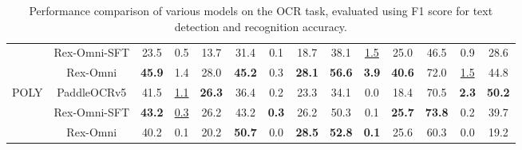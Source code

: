 \begin{table}[t]
{\begin{tabular}{cc|ccc|ccc|ccc|ccc}
& \cellcolor{lightblue!10}Rex-Omni-SFT & \cellcolor{lightblue!10}23.5 & \cellcolor{lightblue!10}0.5 &\cellcolor{lightblue!10} 13.7 & \cellcolor{lightblue!10}31.4 &\cellcolor{lightblue!10} 0.1 & \cellcolor{lightblue!10}18.7 & \cellcolor{lightblue!10}38.1 & \cellcolor{lightblue!10}\underline{1.5} & \cellcolor{lightblue!10}25.0 & \cellcolor{lightblue!10}46.5 & \cellcolor{lightblue!10}0.9 & \cellcolor{lightblue!10}28.6 \\
& \cellcolor{lightblue!10}Rex-Omni & \cellcolor{lightblue!10}\textbf{45.9} & \cellcolor{lightblue!10}1.4 & \cellcolor{lightblue!10}28.0 & \cellcolor{lightblue!10}\textbf{45.2} & \cellcolor{lightblue!10}0.3 & \cellcolor{lightblue!10}\textbf{28.1} & \cellcolor{lightblue!10}\textbf{56.6} & \cellcolor{lightblue!10}\textbf{3.9} & \cellcolor{lightblue!10}\textbf{40.6} & \cellcolor{lightblue!10}72.0 & \cellcolor{lightblue!10}\underline{1.5} & \cellcolor{lightblue!10}44.8 \\
\midrule
\multirow{3}{*}{POLY}
& PaddleOCRv5 & 41.5 & \underline{1.1} & \textbf{26.3} & 36.4 & 0.2 & 23.3 & 34.1 & 0.0 & 18.4 & 70.5 & \textbf{2.3} & \textbf{50.2} \\
& \cellcolor{lightblue!10}Rex-Omni-SFT &\cellcolor{lightblue!10} \textbf{43.2} & \cellcolor{lightblue!10}\underline{0.3} &\cellcolor{lightblue!10} 26.2 & \cellcolor{lightblue!10}43.2 & \cellcolor{lightblue!10}\textbf{0.3} & \cellcolor{lightblue!10}26.2 & \cellcolor{lightblue!10}50.3 & \cellcolor{lightblue!10}0.1 & \cellcolor{lightblue!10}\textbf{25.7} & \cellcolor{lightblue!10}\textbf{73.8} & \cellcolor{lightblue!10}0.2 & \cellcolor{lightblue!10}39.7 \\
& \cellcolor{lightblue!10}Rex-Omni &\cellcolor{lightblue!10} 40.2 & \cellcolor{lightblue!10}0.1 & \cellcolor{lightblue!10}20.2 & \cellcolor{lightblue!10}\textbf{50.7} & \cellcolor{lightblue!10}0.0 & \cellcolor{lightblue!10}\textbf{28.5} & \cellcolor{lightblue!10}\textbf{52.8} & \cellcolor{lightblue!10}\textbf{0.1} & \cellcolor{lightblue!10}25.6 & \cellcolor{lightblue!10}60.3 & \cellcolor{lightblue!10}0.0 & \cellcolor{lightblue!10}19.2 \\
\bottomrule
\end{tabular}
    }
    \caption{Performance comparison of various models on the OCR task, evaluated using F1 score for text detection and recognition accuracy.}
    \label{tab:ocr}
\end{table}
